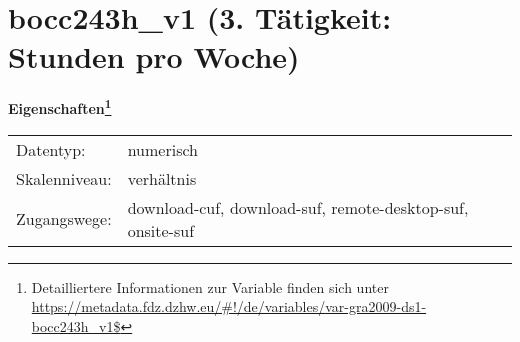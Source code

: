 
    \setcounter{footnote}{0}

    \vspace*{-1.8cm}
	\section{bocc243h\_v1 (3. Tätigkeit: Stunden pro Woche)}
	\label{section:bocc243h_v1}



    \vspace*{0.5cm}
    \noindent\textbf{Eigenschaften\footnote{Detailliertere Informationen zur Variable finden sich unter
		\url{https://metadata.fdz.dzhw.eu/\#!/de/variables/var-gra2009-ds1-bocc243h_v1$}}}\\
	\begin{tabularx}{\hsize}{@{}lX}
	Datentyp: & numerisch \\
	Skalenniveau: & verhältnis \\
	Zugangswege: &
	  download-cuf, 
	  download-suf, 
	  remote-desktop-suf, 
	  onsite-suf
 \\
    \end{tabularx}



